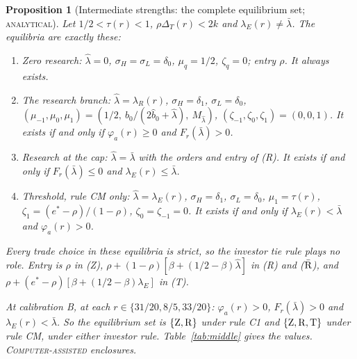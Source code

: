 \documentclass[12pt]{article}
\newtheorem{proposition}{Proposition}
\theoremstyle{definition}
\theoremstyle{remark}
\newcommand{\DT}{\Delta_T}
\newcommand{\lh}{\hat\lambda}
\newcommand{\lb}{\bar\lambda}
\newcommand{\st}[1]{\textsc{#1}}
\begin{document}
\begin{proposition}[Intermediate strengths: the complete equilibrium set; \st{analytical}]\label{prop:middle}
Let $1/2<\tau(r)<1$, $\rho\DT(r)<2k$ and $\lambda_E(r)\ne\lb$. The equilibria are exactly these:
\begin{enumerate}[label=(\Alph*),nosep]
\item[(Z)] \emph{Zero research:} $\lh=0$, $\sigma_H=\sigma_L=\delta_0$, $\mu_q=1/2$, $\zeta_q=0$; entry $\rho$.
  It always exists.
\item[(R)] \emph{The research branch:} $\lh=\lambda_R(r)$, $\sigma_H=\delta_1$, $\sigma_L=\delta_0$,
  $(\mu_{-1},\mu_0,\mu_1)=(1/2,\ \hat b_0/(2\hat b_0+\lh),\ M_{\lh})$, $(\zeta_{-1},\zeta_0,\zeta_1)=(0,0,1)$. It exists
  if and only if $\varphi_a(r)\ge0$ and $F_r(\lb)>0$.
\item[($\bar{\rm R}$)] \emph{Research at the cap:} $\lh=\lb$ with the orders and entry of (R). It exists if and only if
  $F_r(\lb)\le0$ and $\lambda_E(r)\le\lb$.
\item[(T)] \emph{Threshold, rule CM only:} $\lh=\lambda_E(r)$, $\sigma_H=\delta_1$, $\sigma_L=\delta_0$, $\mu_1=\tau(r)$,
  $\zeta_1=(e^*-\rho)/(1-\rho)$, $\zeta_0=\zeta_{-1}=0$. It exists if and only if $\lambda_E(r)<\lb$ and
  $\varphi_a(r)>0$.
\end{enumerate}
Every trade choice in these equilibria is strict, so the investor tie rule plays no role. Entry is $\rho$ in (Z),
$\rho+(1-\rho)[\beta+(1/2-\beta)\lh]$ in (R) and ($\bar{\rm R}$), and $\rho+(e^*-\rho)[\beta+(1/2-\beta)\lambda_E]$ in
(T).

At calibration B, at each $r\in\{31/20,8/5,33/20\}$: $\varphi_a(r)>0$, $F_r(\lb)>0$ and $\lambda_E(r)<\lb$. So the
equilibrium set is $\{{\rm Z},{\rm R}\}$ under rule C1 and $\{{\rm Z},{\rm R},{\rm T}\}$ under rule CM, under either
investor rule. Table~\ref{tab:middle} gives the values. \st{Computer-assisted} enclosures.
\end{proposition}
\end{document}
